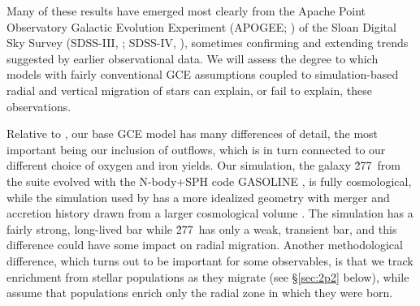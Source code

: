 Many of these results have emerged most clearly from the Apache Point 
Observatory Galactic Evolution Experiment (APOGEE; \citealt{Majewski2017})
of the Sloan Digital Sky Survey (SDSS-III, \citealt{Eisenstein2011};
SDSS-IV, \citealt{Blanton2017}), sometimes confirming and extending trends
suggested by earlier observational data.  We will assess the degree to 
which models with fairly conventional GCE assumptions coupled to 
simulation-based radial and vertical migration of stars can explain, or
fail to explain, these observations.

Relative to \cite{Minchev2013,Minchev2014}, our base GCE model has many 
differences of detail, the most important being our inclusion of outflows,
which is in turn connected to our different choice of oxygen and iron yields.
Our simulation, the galaxy \h277\ from the \cite{Christensen2012} suite
evolved with the N-body+SPH code {\sc GASOLINE}	\citep{Wadsley2004}, is
fully cosmological, while the simulation used by \cite{Minchev2013,Minchev2014}
has a more idealized geometry with merger and accretion history drawn from
a larger cosmological volume \citep{Martig2012}.  
The \cite{Minchev2013,Minchev2014} simulation has a fairly strong, long-lived
bar while \h277\ has only a weak, transient bar, and this difference could
have some impact on radial migration.  Another methodological difference, 
which turns out to be important for some observables, is that we track 
enrichment from stellar populations as they migrate (see \S\ref{sec:2p2} below),
while \cite{Minchev2013,Minchev2014} assume that populations enrich only
the radial zone in which they were born.

